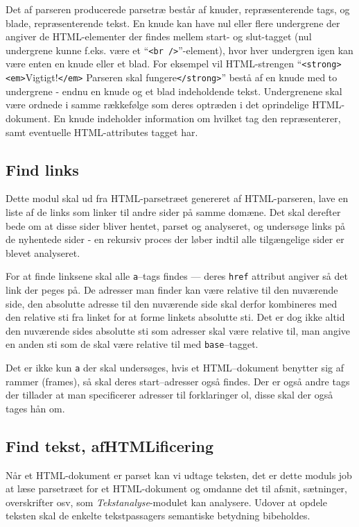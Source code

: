 \documentclass[a4paper,oneside,article, titlepage]{article}
\begin{document}
Det af parseren producerede parsetræ består af knuder, repræsenterende
tags, og blade, repræsenterende tekst. En knude kan have nul eller
flere undergrene der angiver de HTML-elementer der findes mellem
start- og slut-tagget (nul undergrene kunne f.eks. være et
``\texttt{<br />}''-element), hvor hver undergren igen kan være enten
en knude eller et blad. For eksempel vil HTML-strengen
``\texttt{<strong>}\texttt{<em>}Vigtigt!\texttt{</em>} Parseren skal
fungere\texttt{</strong>}'' bestå af en knude med to undergrene -
endnu en knude og et blad indeholdende tekst. Undergrenene skal være
ordnede i samme rækkefølge som deres optræden i det oprindelige
HTML-dokument. En knude indeholder information om hvilket tag den
repræsenterer, samt eventuelle HTML-attributes tagget har.

\subsection{Find links}
Dette modul skal ud fra HTML-parsetræet genereret af HTML-parseren,
lave en liste af de links som linker til andre sider på samme domæne.
Det skal derefter bede om at disse sider bliver hentet, parset og
analyseret, og undersøge links på de nyhentede sider - en rekursiv
proces der løber indtil alle tilgængelige sider er blevet analyseret.

For at finde linksene skal alle \texttt{a}--tags findes --- deres
\texttt{href} attribut angiver så det link der peges på. De adresser
man finder kan være relative til den nuværende side, den absolutte
adresse til den nuværende side skal derfor kombineres med den relative
sti fra linket for at forme linkets absolutte sti. Det er dog ikke
altid den nuværende sides absolutte sti som adresser skal være
relative til, man angive en anden sti som de skal være relative til
med \texttt{base}--tagget. 

Det er ikke kun \texttt{a} der skal undersøges, hvis et HTML--dokument
benytter sig af rammer (frames), så skal deres start--adresser også
findes. Der er også andre tags der tillader at man specificerer
adresser til forklaringer ol, disse skal der også tages hån om.

\subsection{Find tekst, afHTMLificering}
Når et HTML-dokument er parset kan vi udtage teksten, det er dette
moduls job at læse parsetræet for et HTML-dokument og omdanne det til
afsnit, sætninger, overskrifter osv, som \textit{Tekstanalyse}-modulet
kan analysere. Udover at opdele teksten skal de enkelte tekstpassagers
semantiske betydning bibeholdes.
\end{document}
